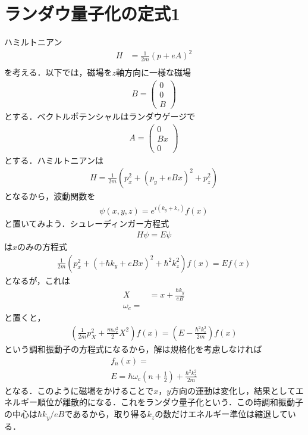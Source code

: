 \documentclass[a4j]{jarticle}
\begin{document}
\section{ランダウ量子化の定式1}
ハミルトニアン
\begin{align*}
 H&=\frac{1}{2m}\left(p+eA\right)^2 \\
\end{align*}
を考える．以下では，磁場を$z$軸方向に一様な磁場
\begin{align*}
 B=\begin{pmatrix}
    0 \\
    0 \\ 
    B
   \end{pmatrix}
\end{align*}
とする．ベクトルポテンシャルはランダウゲージで
\begin{align*}
 A=\begin{pmatrix}
    0 \\
    Bx\\
    0
   \end{pmatrix}
\end{align*}
とする．ハミルトニアンは
\begin{align*}
 H=\frac{1}{2m}\left(p_x^2+(p_y+eBx)^2+p_z^2\right)
\end{align*}
となるから，波動関数を
\begin{align*}
 \psi(x,y,z)=e^{i(k_y+k_z)}f(x)
\end{align*}
と置いてみよう．シュレーディンガー方程式
\begin{align*}
 H\psi = E\psi 
\end{align*}
は$x$のみの方程式
\begin{align*}
 \frac{1}{2m}\left(p_x^2+(+\hbar k_y+eBx)^2+\hbar^2k_z^2\right)f(x)=Ef(x)
\end{align*}
となるが，これは
\begin{align*}
 X&=x+\frac{\hbar k_y}{eB} \\
 \omega_c=
\end{align*}
と置くと，
\begin{align*}
 \left(\frac{1}{2m}p_X^2+\frac{m\omega_c^2}{2}X^2\right)f(x)=\left(E-\frac{\hbar^2k_z^2}{2m}\right)f(x)
\end{align*}
という調和振動子の方程式になるから，解は規格化を考慮しなければ
\begin{align*}
 f_n(x)= \\
 E=\hbar\omega_c\left(n+\frac{1}{2}\right)+\frac{\hbar^2k_z^2}{2m}
\end{align*}
となる．このように磁場をかけることで$x$，$y$方向の運動は変化し，結果としてエネルギー順位が離散的になる．これをランダウ量子化という．この時調和振動子の中心は$\hbar k_y/eB$であるから，取り得る$k_z$の数だけエネルギー準位は縮退している．
\end{document}

